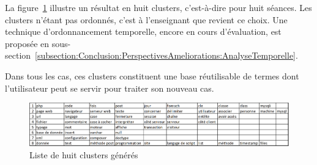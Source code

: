 \bigskip

La figure~\ref{figure:3-II-3-Clusters} illustre un résultat en huit clusters, c'est-à-dire pour huit séances.
Les clusters n'étant pas ordonnés, c'est à l'enseignant que revient ce choix.
Une technique d'ordonnancement temporelle, encore en cours d'évaluation, est proposée en sous-section~\ref{subsection:Conclusion:PerspectivesAmeliorations:AnalyseTemporelle}.

\bigskip

Dans tous les cas, ces clusters constituent une base réutilisable de termes dont l'utilisateur peut se servir pour traiter son nouveau cas.


\bigskip

\vfill
\hspace{0pt}

\begin{figure}[ht]
\centering
\centerline{  %
\includegraphics[scale=0.68]{3-Methode-CREA/exemples/clusters/clusters.png}
}
\caption{Liste de huit clusters générés}
\label{figure:3-II-3-Clusters}
\end{figure}


\hspace{0pt}
\vfill



%
%


